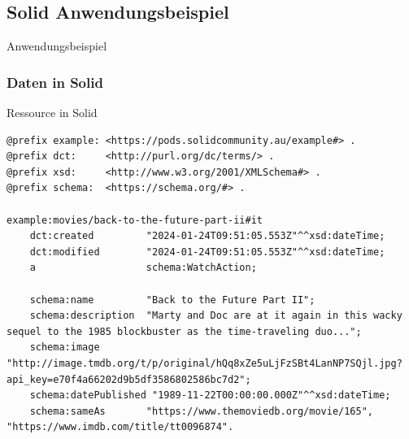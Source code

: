 \documentclass{beamer}              %
\begin{document}
\subsection{Solid Anwendungsbeispiel}
\begin{frame}{Anwendungsbeispiel}
\begin{figure}[htbp]
  \centering
  
\end{figure}
\end{frame}

\subsubsection{Daten in Solid}
\begin{frame}[fragile]{Ressource in Solid}
\begin{minipage}{\linewidth}
\begin{lstlisting}[captionpos=b, caption=Ressource des Films Zurück in die Zukunft II welche in einem Pod abgelegt wurde., label=lst:ressourcebttf2,frame=single]
@prefix example: <https://pods.solidcommunity.au/example#> .
@prefix dct:     <http://purl.org/dc/terms/> .
@prefix xsd:     <http://www.w3.org/2001/XMLSchema#> .
@prefix schema:  <https://schema.org/#> .

example:movies/back-to-the-future-part-ii#it
    dct:created         "2024-01-24T09:51:05.553Z"^^xsd:dateTime;
    dct:modified        "2024-01-24T09:51:05.553Z"^^xsd:dateTime;
    a                   schema:WatchAction;
    
    schema:name         "Back to the Future Part II";
    schema:description  "Marty and Doc are at it again in this wacky sequel to the 1985 blockbuster as the time-traveling duo...";
    schema:image        "http://image.tmdb.org/t/p/original/hQq8xZe5uLjFzSBt4LanNP7SQjl.jpg?api_key=e70f4a66202d9b5df3586802586bc7d2";
    schema:datePublished "1989-11-22T00:00:00.000Z"^^xsd:dateTime;
    schema:sameAs       "https://www.themoviedb.org/movie/165", "https://www.imdb.com/title/tt0096874".
\end{lstlisting}
\end{minipage}
\end{frame}
\end{document}
